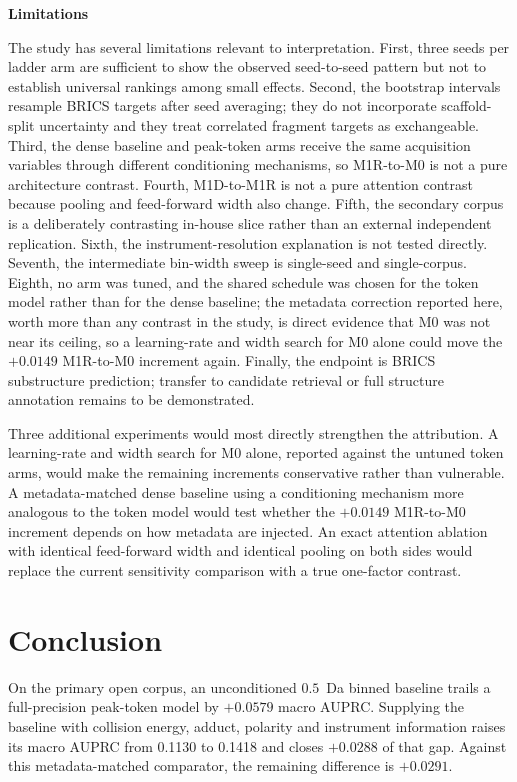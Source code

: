 \documentclass[11pt]{article}
\newcommand{\hd}[1]{\medskip\par\noindent\textbf{#1}\par\nobreak\vspace{2pt}\noindent\ignorespaces}
\begin{document}
\hd{Limitations}
The study has several limitations relevant to interpretation. First, three seeds per ladder arm are sufficient to show the observed seed-to-seed pattern but not to establish universal rankings among small effects. Second, the bootstrap intervals resample BRICS targets after seed averaging; they do not incorporate scaffold-split uncertainty and they treat correlated fragment targets as exchangeable. Third, the dense baseline and peak-token arms receive the same acquisition variables through different conditioning mechanisms, so M1R-to-M0 is not a pure architecture contrast. Fourth, M1D-to-M1R is not a pure attention contrast because pooling and feed-forward width also change. Fifth, the secondary corpus is a deliberately contrasting in-house slice rather than an external independent replication. Sixth, the instrument-resolution explanation is not tested directly. Seventh, the intermediate bin-width sweep is single-seed and single-corpus. Eighth, no arm was tuned, and the shared schedule was chosen for the token model rather than for the dense baseline; the metadata correction reported here, worth more than any contrast in the study, is direct evidence that M0 was not near its ceiling, so a learning-rate and width search for M0 alone could move the $+0.0149$ M1R-to-M0 increment again. Finally, the endpoint is BRICS substructure prediction; transfer to candidate retrieval or full structure annotation remains to be demonstrated.

Three additional experiments would most directly strengthen the attribution. A learning-rate and width search for M0 alone, reported against the untuned token arms, would make the remaining increments conservative rather than vulnerable. A metadata-matched dense baseline using a conditioning mechanism more analogous to the token model would test whether the $+0.0149$ M1R-to-M0 increment depends on how metadata are injected. An exact attention ablation with identical feed-forward width and identical pooling on both sides would replace the current sensitivity comparison with a true one-factor contrast.

\section*{Conclusion}
On the primary open corpus, an unconditioned $0.5$~Da binned baseline trails a full-precision peak-token model by $+0.0579$ macro AUPRC. Supplying the baseline with collision energy, adduct, polarity and instrument information raises its macro AUPRC from 0.1130 to 0.1418 and closes $+0.0288$ of that gap. Against this metadata-matched comparator, the remaining difference is $+0.0291$.
\end{document}
